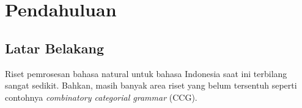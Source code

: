\chapter{Pendahuluan}
\section{Latar Belakang}

Riset pemrosesan bahasa natural untuk bahasa Indonesia saat ini terbilang sangat sedikit.
Bahkan, masih banyak area riset yang belum tersentuh seperti contohnya
\textit{combinatory categorial grammar} (CCG).



